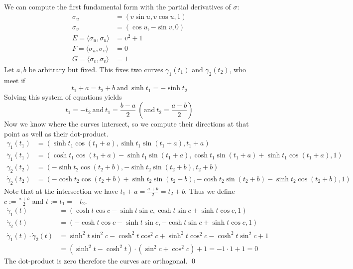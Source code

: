 \documentclass[a4paper,11pt,notitlepage,fullpage]{article}
\begin{document}
\begin{enumerate}
We can compute the first fundamental form with the partial derivatives of $\sigma$:
\begin{align*}
\sigma_u &= \left(v \sin u, v \cos u, 1\right) \\
\sigma_v &= \left(\cos u, -\sin v, 0\right) \\
E = \langle\sigma_u, \sigma_u\rangle &= v^2 + 1 \\
F = \langle\sigma_u, \sigma_v\rangle &= 0 \\
G = \langle\sigma_v, \sigma_v\rangle &= 1
\end{align*}
Let $a, b$ be arbitrary but fixed. This fixes two curves $\gamma_1\left(t_1\right)$ and $\gamma_2\left(t_2\right)$, who meet if
\begin{equation*}
t_1+a = t_2+b ~\text{and}~ \sinh t_1 = - \sinh t_2
\end{equation*}
Solving this system of equations yields
\begin{equation*}
t_1 = -t_2 ~\text{and}~ t_1 = \frac{b-a}{2} ~\left(\text{and}~ t_2 = \frac{a-b}{2}\right)
\end{equation*}
Now we know where the curves intersect, so we compute their directions at that point as well as their dot-product.
\begin{align*}
\gamma_1\left(t_1\right) &= \left(\sinh t_1 \cos\left(t_1+a\right), \sinh t_1 \sin\left(t_1+a\right), t_1+a\right) \\
\dot\gamma_1\left(t_1\right) &= \left(\cosh t_1 \cos\left(t_1+a\right) - \sinh t_1 \sin\left(t_1+a\right), \cosh t_1 \sin\left(t_1+a\right) + \sinh t_1 \cos\left(t_1+a\right), 1\right) \\
\gamma_2\left(t_2\right) &= \left(-\sinh t_2 \cos\left(t_2+b\right), -\sinh t_2 \sin\left(t_2+b\right), t_2+b\right) \\
\dot\gamma_2\left(t_2\right) &= \left(-\cosh t_2 \cos\left(t_2+b\right) + \sinh t_2 \sin\left(t_2+b\right), -\cosh t_2 \sin\left(t_2+b\right) - \sinh t_2 \cos\left(t_2+b\right), 1\right)
\end{align*}
Note that at the intersection we have $t_1+a = \frac{a+b}{2} = t_2+b$. Thus we define $c:=\frac{a+b}{2}$ and $t := t_1 = -t_2$.
\begin{align*}
\dot\gamma_1\left(t\right) &= \left(\cosh t \cos c - \sinh t \sin c, \cosh t \sin c + \sinh t \cos c, 1\right) \\
\dot\gamma_2\left(t\right) &= \left(-\cosh t \cos c - \sinh t \sin c, -\cosh t \sin c + \sinh t \cos c, 1\right) \\
\dot\gamma_1\left(t\right)\cdot\dot\gamma_2\left(t\right) &= \sinh^2t\sin^2c - \cosh^2t\cos^2c + \sinh^2t\cos^2c - \cosh^2t\sin^2c + 1 \\
&= \left(\sinh^2t - \cosh^2t\right)\cdot\left(\sin^2c+\cos^2c\right) + 1 = -1 \cdot 1 + 1 = 0
\end{align*}
The dot-product is zero therefore the curves are orthogonal. \qed


\end{enumerate}
\end{document}
